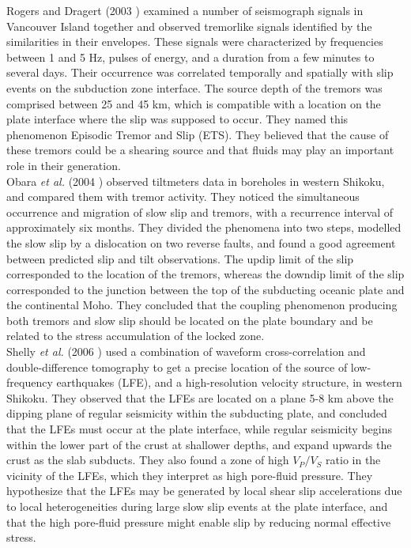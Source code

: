 \documentclass[main.tex]{subfiles}
\begin{document}
Rogers and Dragert (2003 \cite{ROG_2003}) examined a number of seismograph signals in Vancouver Island together and observed tremorlike signals identified by the similarities in their envelopes. These signals were characterized by frequencies between 1 and 5 Hz, pulses of energy, and a duration from a few minutes to several days. Their occurrence was correlated temporally and spatially with slip events on the subduction zone interface. The source depth of the tremors was comprised between 25 and 45 km, which is compatible with a location on the plate interface where the slip was supposed to occur. They named this phenomenon Episodic Tremor and Slip (ETS). They believed that the cause of these tremors could be a shearing source and that fluids may play an important role in their generation. \\

Obara \textit{et al.} (2004 \cite{OBA_2004}) observed tiltmeters data in boreholes in western Shikoku, and compared them with tremor activity. They noticed the simultaneous occurrence and migration of slow slip and tremors, with a recurrence interval of approximately six months. They divided the phenomena into two steps, modelled the slow slip by a dislocation on two reverse faults, and found a good agreement between predicted slip and tilt observations. The updip limit of the slip corresponded to the location of the tremors, whereas the downdip limit of the slip corresponded to the junction between the top of the subducting oceanic plate and the continental Moho. They concluded that the coupling phenomenon producing both tremors and slow slip should be located on the plate boundary  and be related to the stress accumulation of the locked zone.\\

Shelly \textit{et al.} (2006 \cite{SHE_2006}) used a combination of waveform cross-correlation and double-difference tomography to get a precise location of the source of low-frequency earthquakes (LFE), and a high-resolution velocity structure, in western Shikoku. They observed that the LFEs are located on a plane 5-8 km above the dipping plane of regular seismicity within the subducting plate, and concluded that the LFEs must occur at the plate interface, while regular seismicity begins within the lower part of the crust at shallower depths, and expand upwards the crust as the slab subducts. They also found a zone of high $V_P / V_S$ ratio in the vicinity of the LFEs, which they interpret as high pore-fluid pressure. They hypothesize that the LFEs may be generated by local shear slip accelerations due to local heterogeneities during large slow slip events at the plate interface, and that the high pore-fluid pressure might enable slip by reducing normal effective stress. \\
\end{document}
